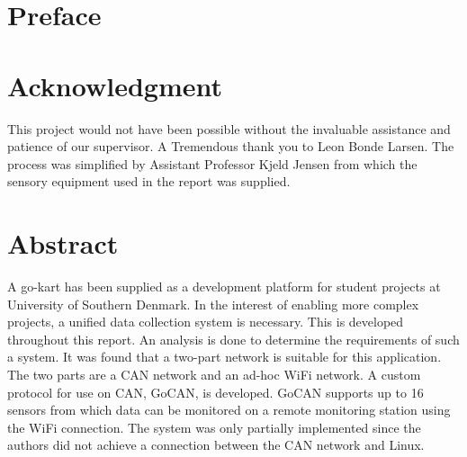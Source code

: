 \section*{Preface}

\section*{Acknowledgment}
This project would not have been possible without the invaluable assistance and patience of our supervisor. 
A Tremendous thank you to Leon Bonde Larsen.
The process was simplified by Assistant Professor Kjeld Jensen from which the sensory equipment used in the report was supplied.

\section*{Abstract}
A go-kart has been supplied as a development platform for student projects at University of Southern Denmark.
In the interest of enabling more complex projects, a unified data collection system is necessary.
This is developed throughout this report. 
An analysis is done to determine the requirements of such a system.
It was found that a two-part network is suitable for this application.
The two parts are a CAN network and an ad-hoc WiFi network.
A custom protocol for use on CAN, GoCAN, is developed.
GoCAN supports up to 16 sensors from which data can be monitored on a remote monitoring station using the WiFi connection.
The system was only partially implemented since the authors did not achieve a connection between the CAN network and Linux.
